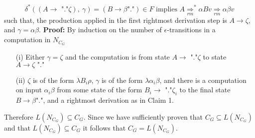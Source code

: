 \documentclass[12pt]{article}
\begin{document}
$$\delta^*((A \rightarrow \text{ "."}\zeta),\ \gamma) =
(B \rightarrow \beta\text{"."}) \in F \text{ implies }
A \underset{rm}{\Longrightarrow}^* \alpha Bv \underset{rm}{\Longrightarrow}
\alpha \beta v$$
such that, the production applied in the first
rightmost derivation step is $A \rightarrow \zeta$, and $\gamma=\alpha\beta$.
\medskip\newline
\textbf{Proof: } By induction on the number of $\epsilon$-transitions in a
computation in $N_{C_G}$
\begin{enumerate}
\item[(i)]
Either $\gamma = \zeta$  and the computation is from state
$A \rightarrow \text{ "."}\zeta$ to state $A \rightarrow \zeta\text{ "."}$
\item[(ii)]
$\zeta$ is of the form $\lambda B_i\rho$,
$\gamma$ is of the form $\lambda \alpha_i \beta$, and there is
a computation on input
$\alpha_i \beta$ from some state of the form
$B_i \rightarrow \text{ "."}\zeta_i$
to the final state $B \rightarrow \beta\text{"."}$,
and a rightmost derivation as in Claim 1.
\end{enumerate}

\noindent Therefore $L(N_{C_G}) \subseteq C_G$.
\medskip\newline
Since we have sufficiently proven that $C_G \subseteq L(N_{C_G})$
and that $L(N_{C_G}) \subseteq C_G$ it follows that $C_G = L(N_{C_G})$.
\end{document}
